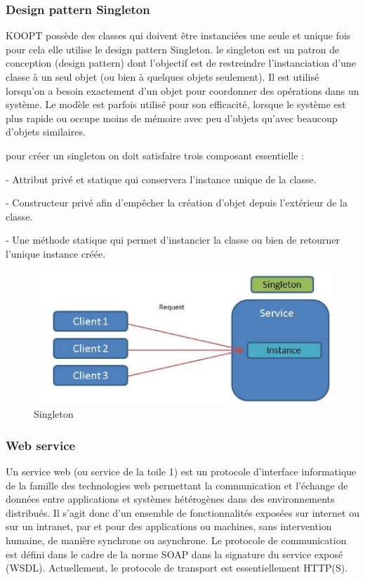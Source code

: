 \subsubsection{Design pattern  Singleton}

KOOPT possède des classes qui doivent être instanciées une seule et unique fois pour cela elle utilise le design pattern Singleton.
le singleton est un patron de conception (design pattern) dont l'objectif est de restreindre l'instanciation d'une classe à un seul objet (ou bien à quelques objets seulement). Il est utilisé lorsqu'on a besoin exactement d'un objet pour coordonner des opérations dans un système. Le modèle est parfois utilisé pour son efficacité, lorsque le système est plus rapide ou occupe moins de mémoire avec peu d'objets qu'avec beaucoup d'objets similaires.
 
pour créer un singleton on doit satisfaire trois composant essentielle :

- Attribut privé et statique qui conservera l'instance unique de la classe.

- Constructeur privé afin d'empêcher la création d'objet depuis l'extérieur de la classe.

- Une méthode statique qui permet d'instancier la classe ou bien de retourner l'unique instance créée.

\begin{figure}[H]
\begin{center}
\includegraphics[width=1\linewidth]{images/singleton}
\end{center}
\caption{Singleton}
\label{fig:6}
\end{figure}

\subsubsection{Web service}
 Un service web (ou service de la toile 1) est un protocole d'interface informatique de la famille des technologies web permettant la communication et l'échange de données entre applications et systèmes hétérogènes dans des environnements distribués. Il s'agit donc d'un ensemble de fonctionnalités exposées sur internet ou sur un intranet, par et pour des applications ou machines, sans intervention humaine, de manière synchrone ou asynchrone. Le protocole de communication est défini dans le cadre de la norme SOAP dans la signature du service exposé (WSDL). Actuellement, le protocole de transport est essentiellement HTTP(S).\cite{webservice}


